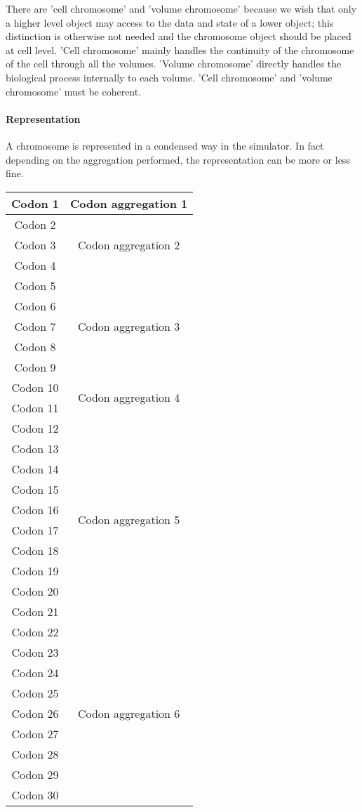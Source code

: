 There are 'cell chromosome' and 'volume chromosome' because we wish that only a higher level object may access to the data and state of a lower object; this distinction is otherwise not needed and the chromosome object should be placed at cell level. 'Cell chromosome' mainly handles the continuity of the chromosome of the cell through all the volumes. 'Volume chromosome' directly handles the biological process internally to each volume. 'Cell chromosome' and 'volume chromosome' must be coherent.


\paragraph{Representation} A chromosome is represented in a condensed way in the simulator. In fact depending on the aggregation performed, the representation can be more or less fine.
\begin{center}
\begin{tabular}{|c|c|}
  \hline
  Codon 1  & \multirow{1}{*}{Codon aggregation 1} \\
  \hline
  Codon 2  & \multirow{3}{*}{Codon aggregation 2} \\
  Codon 3  &  \\
  Codon 4  &  \\
  \hline
  Codon 5  & \multirow{5}{*}{Codon aggregation 3} \\
  Codon 6  &  \\
  Codon 7  &  \\
  Codon 8  &  \\
  Codon 9  &  \\
  \hline
  Codon 10 & \multirow{2}{*}{Codon aggregation 4} \\
  Codon 11 &  \\
  \hline
  Codon 12 & \multirow{10}{*}{Codon aggregation 5} \\
  Codon 13 &  \\
  Codon 14 &  \\
  Codon 15 &  \\
  Codon 16 &  \\
  Codon 17 &  \\
  Codon 18 &  \\
  Codon 19 &  \\
  Codon 20 &  \\
  Codon 21 &  \\
  \hline
  Codon 22 & \multirow{9}{*}{Codon aggregation 6} \\
  Codon 23 &  \\
  Codon 24 &  \\
  Codon 25 &  \\
  Codon 26 &  \\
  Codon 27 &  \\
  Codon 28 &  \\
  Codon 29 &  \\
  \hline
  Codon 30 & \multirow{1}{*}{Codon aggregation 7} \\
  \hline
\end{tabular}
\end{center}
